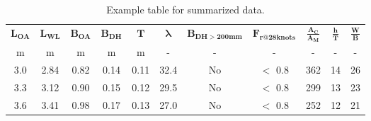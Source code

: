 \begin{table}[H] %
	\centering
	\caption{Example table for summarized data.}
	\label{table_2}		
	\begin{tabular}{c|c|c|c|c|c|c|c|c|c|c}
		\toprule 
		$\boldsymbol{L_{OA}}$ & $\boldsymbol{L_{WL}}$ & $\boldsymbol{B_{OA}}$ & $\boldsymbol{B_{DH}}$ & $\boldsymbol{T}$ & $\boldsymbol{\lambda}$ & $\boldsymbol{B_{DH>200mm}}$  & $\boldsymbol{F_{r@28knots}}$ & $\boldsymbol{\frac{A_{C}}{A_{M}}}$ & $\boldsymbol{\frac{h}{T}}$ & $\boldsymbol{\frac{W}{B}}$ \\
		\cmidrule(lr{.75em}){1-11}  
		m & m & m & m & m & - & - & - & - & - & - \\
		\midrule 
		3.0 & 2.84 & 0.82 & 0.14 & 0.11 & 32.4 & No  & $<$ 0.8 & 362 & 14 & 26 \\
		3.3 & 3.12 & 0.90 & 0.15 & 0.12 & 29.5 & No  & $<$ 0.8 & 299 & 13 & 23 \\
		3.6 & 3.41 & 0.98 & 0.17 & 0.13 & 27.0 & No  & $<$ 0.8 & 252 & 12 & 21 \\
		\bottomrule
	\end{tabular}
\end{table}

